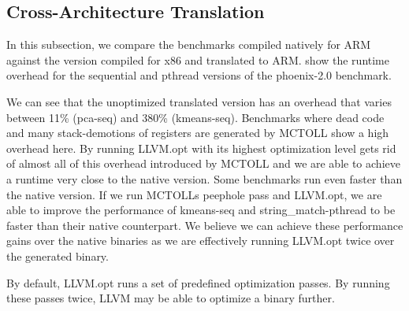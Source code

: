 \subsection{Cross-Architecture Translation}\label{subsec:cross-architecture-translation}

In this subsection, we compare the benchmarks compiled natively for ARM against the version compiled for x86 and translated to ARM\@.
 show the runtime overhead for the sequential and pthread versions of the phoenix-2.0 benchmark.

We can see that the unoptimized translated version has an overhead that varies between 11\% (pca-seq) and 380\% (kmeans-seq).
Benchmarks where dead code and many stack-demotions of registers are generated by MCTOLL show a high overhead here.
By running LLVM.opt with its highest optimization level gets rid of almost all of this overhead introduced by MCTOLL and we are able to achieve a runtime very close to the native version.
Some benchmarks run even faster than the native version.
If we run MCTOLLs peephole pass and LLVM.opt, we are able to improve the performance of kmeans-seq and string\_match-pthread to be faster than their native counterpart.
We believe we can achieve these performance gains over the native binaries as we are effectively running LLVM.opt twice over the generated binary.

By default, LLVM.opt runs a set of predefined optimization passes.
By running these passes twice, LLVM may be able to optimize a binary further.

